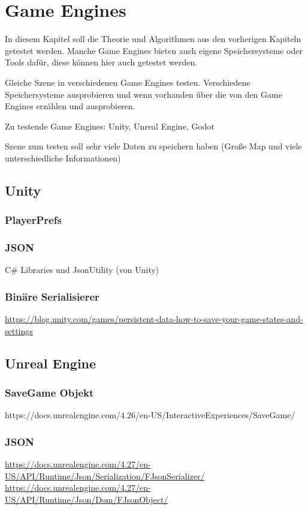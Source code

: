 \chapter{Game Engines}\label{ch:gameengines}
In diesem Kapitel soll die Theorie und Algorithmen aus den vorherigen Kapiteln 
getestet werden. Manche Game Engines bieten auch eigene Speichersysteme oder
Tools dafür, diese können hier auch getestet werden.

Gleiche Szene in verschiedenen Game Engines testen. 
Verschiedene Speichersysteme ausprobieren und wenn vorhanden über die von den Game Engines erzählen und ausprobieren.

Zu testende Game Engines: Unity, Unreal Engine, Godot

Szene zum testen soll sehr viele Daten zu speichern haben (Große Map und viele unterschiedliche Informationen)

\section{Unity}
\subsection{PlayerPrefs}
\subsection{JSON}
C\# Libraries und JsonUtility (von Unity)
\subsection{Binäre Serialisierer}

\url{https://blog.unity.com/games/persistent-data-how-to-save-your-game-states-and-settings}

\section{Unreal Engine}
\subsection{SaveGame Objekt}
https://docs.unrealengine.com/4.26/en-US/InteractiveExperiences/SaveGame/

\subsection{JSON}
\url{https://docs.unrealengine.com/4.27/en-US/API/Runtime/Json/Serialization/FJsonSerializer/}\\
\url{https://docs.unrealengine.com/4.27/en-US/API/Runtime/Json/Dom/FJsonObject/}

